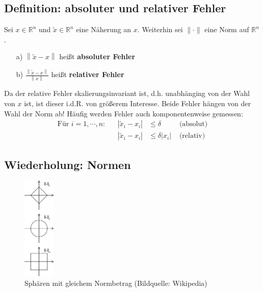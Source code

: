 \documentclass[ngerman,fontsize=11pt, paper=a4, parskip=half, titlepage=true, toc=bib]{scrbook}
\newcommand{\R}{\mathds{R}}
\newcommand{\nn}[1]{\left\| #1 \right\|}
\begin{document}
  \subsection{Definition: absoluter und relativer Fehler} \label{3.2.2} 
  Sei $x\in\R^n$ und $\widetilde{x} \in \R^n$ eine Näherung an $x$. Weiterhin sei $\|\cdot\|$ eine Norm auf $\R^n$.
  \begin{itemize}
  \item[a)] $\nn{\widetilde{x} - x}$ heißt \textbf{absoluter Fehler} 
  \item[b)] $\frac{\nn{\widetilde{x} - x}}{\nn{x}}$ heißt \textbf{relativer Fehler}
  \end{itemize}
  Da der relative Fehler skalierungsinvariant ist, d.h. unabhänging von der  Wahl von $x$ ist, ist dieser i.d.R. von größerem Interesse.
  Beide Fehler hängen von der Wahl der Norm ab!
  Häufig werden Fehler auch komponentenweise gemessen:
  \begin{align*}
    \text{Für } i=1,\cdots , n : && |\widetilde{x}_i - x_i | & \leq \delta & \text{ (absolut)} \\
                                 && |\widetilde{x}_i - x_i | &\leq \delta |x_i| & \text{ (relativ)}
  \end{align*}

  \subsection{Wiederholung: Normen} \label{3.2.3}
  \begin{figure}
    \centering
    \includegraphics[width=1.5cm]{images/normen.png}
    \caption{Sphären mit gleichem Normbetrag (Bildquelle: Wikipedia)}
  \end{figure}
\end{document}

